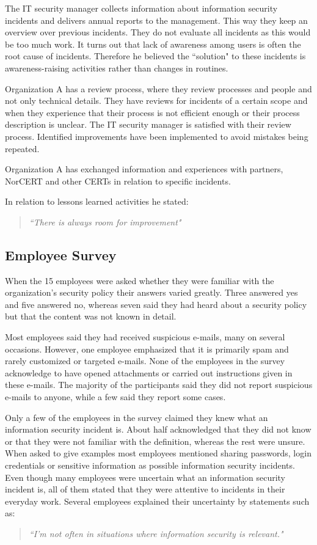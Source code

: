 The IT security manager collects information about information security incidents and delivers annual reports to the management. This way they keep an overview over previous incidents. They do not evaluate all incidents as this would be too much work. It turns out that lack of awareness among users is often the root cause of incidents. Therefore he believed the ``solution" to these incidents is awareness-raising activities rather than changes in routines.

Organization A has a review process, where they review processes and people and not only technical details. They have reviews for incidents of a certain scope and when they experience that their process is not efficient enough or their process description is unclear. The IT security manager is satisfied with their review process. Identified improvements have been implemented to avoid mistakes being repeated.

Organization A has exchanged information and experiences with partners, \acs{NorCERT} and other \acp{CERT} in relation to specific incidents.

In relation to lessons learned activities he stated: 

\begin{quote}
\textit{``There is always room for improvement"}
\end{quote}

\subsection{Employee Survey}
When the 15 employees were asked whether they were familiar with the organization's security policy their answers varied greatly. Three answered yes and five answered no, whereas seven said they had heard about a security policy but that the content was not known in detail. 

Most employees said they had received suspicious e-mails, many on several occasions. However, one employee emphasized that it is primarily spam and rarely customized or targeted e-mails. None of the employees in the survey acknowledge to have opened attachments or carried out instructions given in these e-mails. The majority of the participants said they did not report suspicious e-mails to anyone, while a few said they report some cases.

Only a few of the employees in the survey claimed they knew what an information security incident is. About half acknowledged that they did not know or that they were not familiar with the definition, whereas the rest were unsure. When asked to give examples most employees mentioned sharing passwords, login credentials or sensitive information as possible information security incidents. Even though many employees were uncertain what an information security incident is, all of them stated that they were attentive to incidents in their everyday work. 
Several employees explained their uncertainty by statements such as:
\begin{quote}
\textit{``I'm not often in situations where information security is relevant."}
\end{quote}

